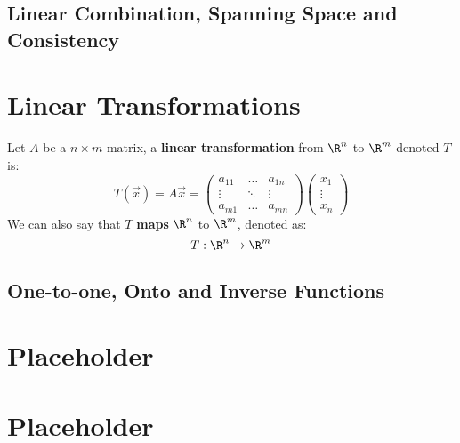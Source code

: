 \documentclass[a4paper]{article}
\begin{document}
  \subsection{Linear Combination, Spanning Space and Consistency}
  \section{Linear Transformations} 
  Let $A$ be a $n\times m$ matrix, a \textbf{linear transformation} from $\R^n$ to $\R^m$ denoted $T$ is:
  \[
    T(\vec{x})= A\vec{x} = 
    \begin{pmatrix}
      a_{11} & \dots & a_{1n} \\
      \vdots & \ddots & \vdots \\
      a_{m1} & \dots & a_{mn}
    \end{pmatrix}
    \begin{pmatrix}
     x_1 \\
     \vdots \\
     x_n
    \end{pmatrix}
  \]
  We can also say that $T$ \textbf{maps} $\R^n$ to $\R^m$, denoted as:
  \[
    T: \R^n \rightarrow \R^m
  \]
  \subsection{One-to-one, Onto and Inverse Functions}
  \section{Placeholder} 
  \section{Placeholder} 
\end{document}
